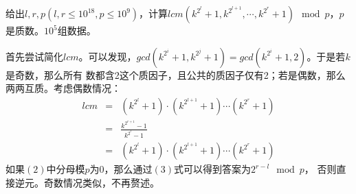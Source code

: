 \begin{prob}
	给出$l,r,p(l,r \le 10^{18}, p \le 10^9)$，计算$lcm(k^{2^l}+1, k^{2^{l+1}}, 
	\cdots, k^{2^r}+1) \mod p$，$p$是质数。$10^5$组数据。
\end{prob}

\begin{sol}
	首先尝试简化$lcm$。可以发现，$gcd(k^{2^i}+1, k^{2^{j}}+1)
	= gcd(k^{2^i}+1, 2)$。于是若$k$是奇数，那么所有
	数都含2这个质因子，且公共的质因子仅有2；若是偶数，那么
	两两互质。考虑偶数情况：
	\begin{eqnarray}
		lcm & = & (k^{2^l}+1) \cdot (k^{2^{l+1}}+1) \cdots (k^{2^r}+1) \\
			& = & \frac{k^{2^{r+1}}-1}{k^{2^{l}}-1} \\
		   & = & (k^{2^l}+1) \cdot (k^{2^{l+1}}+1) \cdots (k^{2^r}+1)
	\end{eqnarray}
	如果$(2)$中分母模$p$为0，那么通过$(3)$式可以得到答案为$2^{r-l} \mod p$，
	否则直接逆元。奇数情况类似，不再赘述。
\end{sol}
